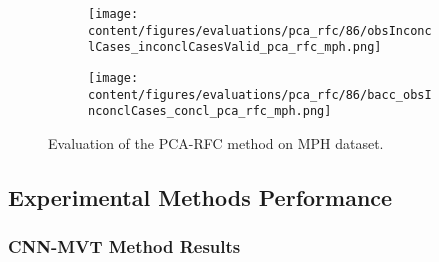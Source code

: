 

\begin{figure}[t]
  \begin{subfigure}{0.9\textwidth}
    \centering
    \texttt{[image: content/figures/evaluations/pca\_rfc/86/obsInconclCases\_inconclCasesValid\_pca\_rfc\_mph.png]}
    \label{fig:obsInconclCases_inconclCasesValid_pca_rfc_mph}
  \end{subfigure}
  \hfill
  \begin{subfigure}{0.9\textwidth}
    \centering
    \texttt{[image: content/figures/evaluations/pca\_rfc/86/bacc\_obsInconclCases\_concl\_pca\_rfc\_mph.png]}
    \label{fig:bacc_obsInconclCases_concl_pca_rfc_mph}
  \end{subfigure}
  \caption{Evaluation of the PCA-RFC method on MPH dataset.}
\end{figure}


\subsection{Experimental Methods Performance}
\label{subsec:exp_methods_perf}

\subsubsection{CNN-MVT Method Results}
\label{subsubsec:eval_mvt}






